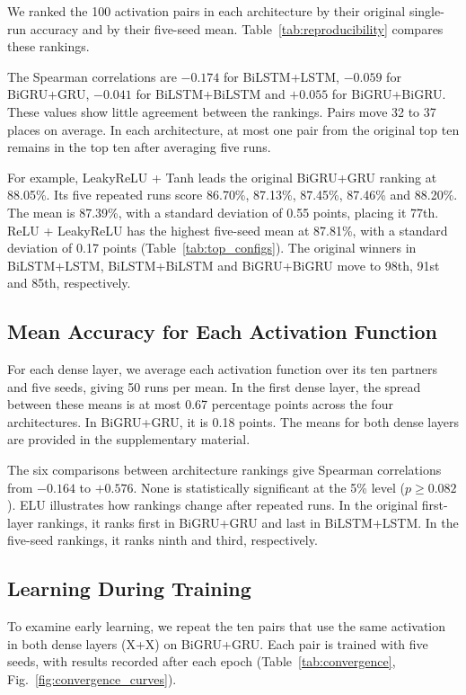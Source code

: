 \documentclass[conference,a4paper]{IEEEtran}
\begin{document}
We ranked the 100 activation pairs in each architecture
by their original single-run accuracy and by their
five-seed mean. Table~\ref{tab:reproducibility} compares
these rankings.



The Spearman correlations are $-0.174$ for BiLSTM+LSTM,
$-0.059$ for BiGRU+GRU, $-0.041$ for BiLSTM+BiLSTM and
$+0.055$ for BiGRU+BiGRU. These values show little agreement
between the rankings. Pairs move 32 to 37 places on average.
In each architecture, at most one pair from the original
top ten remains in the top ten after averaging five runs.

For example, LeakyReLU + Tanh leads the original BiGRU+GRU
ranking at 88.05\%. Its five repeated runs score 86.70\%,
87.13\%, 87.45\%, 87.46\% and 88.20\%. The mean is 87.39\%,
with a standard deviation of 0.55 points, placing it 77th.
ReLU + LeakyReLU has the highest five-seed mean at 87.81\%,
with a standard deviation of 0.17 points
(Table~\ref{tab:top_configs}). The original winners in
BiLSTM+LSTM, BiLSTM+BiLSTM and BiGRU+BiGRU move to
98th, 91st and 85th, respectively.

\subsection{Mean Accuracy for Each Activation Function}

For each dense layer, we average each activation function
over its ten partners and five seeds, giving 50 runs per
mean. In the first dense layer, the spread between these
means is at most 0.67 percentage points across the four
architectures. In BiGRU+GRU, it is 0.18 points.
The means for both dense layers are provided in the
supplementary material.

The six comparisons between architecture rankings give
Spearman correlations from $-0.164$ to $+0.576$. None is
statistically significant at the 5\% level ($p\geq0.082$).
ELU illustrates how rankings change after repeated runs.
In the original first-layer rankings, it ranks first in
BiGRU+GRU and last in BiLSTM+LSTM. In the five-seed
rankings, it ranks ninth and third, respectively.

\subsection{Learning During Training}

To examine early learning, we repeat the ten pairs that
use the same activation in both dense layers (X+X) on
BiGRU+GRU. Each pair is trained with five seeds, with
results recorded after each epoch
(Table~\ref{tab:convergence},
Fig.~\ref{fig:convergence_curves}).
\end{document}
